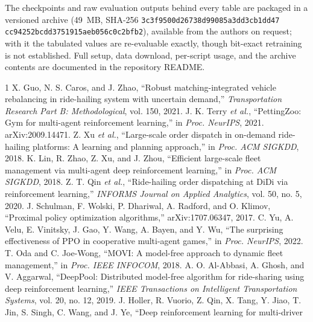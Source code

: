 \documentclass[conference]{IEEEtran}
\begin{document}
\begin{sloppypar}
The checkpoints and raw evaluation outputs behind every table are packaged in
a versioned archive (49~MB, SHA-256
\texttt{3c3f9500d26738d9}\allowbreak\texttt{9085a3dd3cb1dd47}\allowbreak
\texttt{cc94252bcdd37519}\allowbreak\texttt{15aeb056c0c2bfb2}), available
from the authors on request; with it the tabulated values are re-evaluable
exactly, though bit-exact retraining is not established. Full setup, data
download, per-script usage, and the archive contents are documented in the
repository README.
\end{sloppypar}

\par
\endgroup

\begin{thebibliography}{1}
 X. Guo, N. S. Caros, and J. Zhao, ``Robust
matching-integrated vehicle rebalancing in ride-hailing system with uncertain
demand,'' \emph{Transportation Research Part B: Methodological}, vol. 150,
2021.
 J. K. Terry \emph{et al.}, ``PettingZoo: Gym for
multi-agent reinforcement learning,'' in \emph{Proc. NeurIPS}, 2021.
arXiv:2009.14471.
 Z. Xu \emph{et al.}, ``Large-scale order dispatch in
on-demand ride-hailing platforms: A learning and planning approach,'' in
\emph{Proc. ACM SIGKDD}, 2018.
 K. Lin, R. Zhao, Z. Xu, and J. Zhou, ``Efficient large-scale
fleet management via multi-agent deep reinforcement learning,'' in
\emph{Proc. ACM SIGKDD}, 2018.
 Z. T. Qin \emph{et al.}, ``Ride-hailing order dispatching at
DiDi via reinforcement learning,'' \emph{INFORMS Journal on Applied
Analytics}, vol. 50, no. 5, 2020.
 J. Schulman, F. Wolski, P. Dhariwal, A. Radford, and O.
Klimov, ``Proximal policy optimization algorithms,'' arXiv:1707.06347, 2017.
 C. Yu, A. Velu, E. Vinitsky, J. Gao, Y. Wang, A. Bayen, and
Y. Wu, ``The surprising effectiveness of PPO in cooperative multi-agent
games,'' in \emph{Proc. NeurIPS}, 2022.
 T. Oda and C. Joe-Wong, ``MOVI: A model-free approach to
dynamic fleet management,'' in \emph{Proc. IEEE INFOCOM}, 2018.
 A. O. Al-Abbasi, A. Ghosh, and V. Aggarwal, ``DeepPool:
Distributed model-free algorithm for ride-sharing using deep reinforcement
learning,'' \emph{IEEE Transactions on Intelligent Transportation Systems},
vol. 20, no. 12, 2019.
 J. Holler, R. Vuorio, Z. Qin, X. Tang, Y. Jiao, T. Jin,
S. Singh, C. Wang, and J. Ye, ``Deep reinforcement learning for multi-driver

\end{thebibliography}
\end{document}
